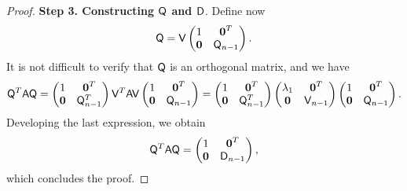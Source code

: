 \begin{proof}
            \vspace{.3cm}
            \textbf{Step 3. Constructing $\mathsf Q$ and $\mathsf D$}.
            Define now
            \[
                \mathsf Q =
                \mathsf V
                \begin{pmatrix}
                    1 & \mathbf{\boldsymbol{0}}^T \\
                    \mathbf{\boldsymbol{0}} & \mathsf Q_{n-1}
                \end{pmatrix}.
            \]
            It is not difficult to verify that $\mathsf Q$ is an orthogonal matrix,
            and we have
            \[
                \mathsf Q^T \mathsf A \mathsf Q =
                \begin{pmatrix}
                    1 & \mathbf{\boldsymbol{0}}^T \\
                    \mathbf{\boldsymbol{0}} & \mathsf Q_{n-1}^T
                \end{pmatrix}
                \mathsf V^T \mathsf A \mathsf V
                \begin{pmatrix}
                    1 & \mathbf{\boldsymbol{0}}^T \\
                    \mathbf{\boldsymbol{0}} & \mathsf Q_{n-1}
                \end{pmatrix}
                =
                \begin{pmatrix}
                    1 & \mathbf{\boldsymbol{0}}^T \\
                    \mathbf{\boldsymbol{0}} & \mathsf Q_{n-1}^T
                \end{pmatrix}
                \begin{pmatrix}
                    \lambda_1 & \mathbf{\boldsymbol{0}}^T \\
                    \mathbf{\boldsymbol{0}} & \mathsf V_{n-1}
                \end{pmatrix}
                \begin{pmatrix}
                    1 & \mathbf{\boldsymbol{0}}^T \\
                    \mathbf{\boldsymbol{0}} & \mathsf Q_{n-1}
                \end{pmatrix}.
            \]
            Developing the last expression, we obtain
            \[
                \mathsf Q^T \mathsf A \mathsf Q
                =
                \begin{pmatrix}
                    1 & \mathbf{\boldsymbol{0}}^T \\
                    \mathbf{\boldsymbol{0}} & \mathsf D_{n-1}
                \end{pmatrix},
            \]
            which concludes the proof.
\end{proof}

